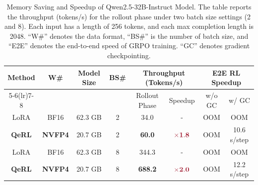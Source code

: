 \begin{table}[!t]
\centering
\begin{tabular}{cccccccc}
\toprule
\multirow{2}{*}{\textbf{Method}} & \multirow{2}{*}{\textbf{W\#}} & \multirow{2}{*}{\textbf{Model Size}} & \multirow{2}{*}{\textbf{BS\#}} & \multicolumn{2}{c}{\textbf{Throughput (Tokens/s)}}&\multicolumn{2}{c}{\textbf{E2E RL Speedup}} \\ 
\cmidrule(lr){5-6}\cmidrule(lr){7-8}
&&&& Rollout Phase & Speedup & w/o GC & w/ GC \\
\midrule
LoRA&BF16  & 62.3 GB& 2 & 34.0 & - & OOM & OOM \\  
\textbf{QeRL}&\textbf{NVFP4}  & 20.7 GB& 2  & \textbf{60.0}&$\textcolor{hanred}{\times\mathbf{1.8}}$& OOM & 10.6 s/step \\ 
\midrule \midrule
LoRA&BF16  &62.3 GB& 8 &344.3& - & OOM & OOM\\ 
\textbf{QeRL}&\textbf{NVFP4}   &  20.7 GB& 8 &\textbf{688.2}&$\textcolor{hanred}{\times\mathbf{2.0}}$& OOM & 12.2 s/step\\ 
\bottomrule
\end{tabular}
\caption{Memory Saving and Speedup of Qwen2.5-32B-Instruct Model. The table reports the throughput (tokens/s) for the rollout phase under two batch size settings (2 and 8). Each input has a length of 256 tokens, and each max completion length is 2048. ``W\#'' denotes the data format, ``BS\#'' is the number of batch size, and ``E2E'' denotes the end-to-end speed of GRPO training. ``GC'' denotes gradient checkpointing.} \label{tab:efficiency_32b}
\end{table}

